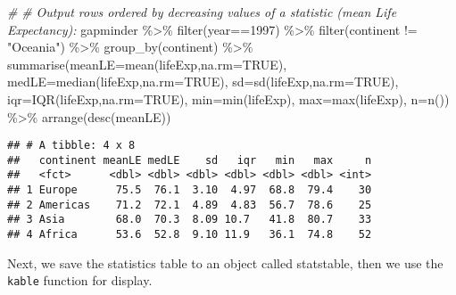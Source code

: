 \documentclass[
]{book}
\newenvironment{Shaded}{\begin{snugshade}}{\end{snugshade}}
\newcommand{\AttributeTok}[1]{\textcolor[rgb]{0.77,0.63,0.00}{#1}}
\newcommand{\CommentTok}[1]{\textcolor[rgb]{0.56,0.35,0.01}{\textit{#1}}}
\newcommand{\ConstantTok}[1]{\textcolor[rgb]{0.00,0.00,0.00}{#1}}
\newcommand{\DecValTok}[1]{\textcolor[rgb]{0.00,0.00,0.81}{#1}}
\newcommand{\FunctionTok}[1]{\textcolor[rgb]{0.00,0.00,0.00}{#1}}
\newcommand{\NormalTok}[1]{#1}
\newcommand{\SpecialCharTok}[1]{\textcolor[rgb]{0.00,0.00,0.00}{#1}}
\newcommand{\StringTok}[1]{\textcolor[rgb]{0.31,0.60,0.02}{#1}}
\begin{document}
\begin{Shaded}
\begin{Highlighting}[]
\CommentTok{\#}
\CommentTok{\# Output rows ordered by decreasing values of a statistic (mean Life Expectancy):}
\NormalTok{gapminder }\SpecialCharTok{\%\textgreater{}\%} \FunctionTok{filter}\NormalTok{(year}\SpecialCharTok{==}\DecValTok{1997}\NormalTok{) }\SpecialCharTok{\%\textgreater{}\%} 
  \FunctionTok{filter}\NormalTok{(continent }\SpecialCharTok{!=} \StringTok{"Oceania"}\NormalTok{) }\SpecialCharTok{\%\textgreater{}\%} 
  \FunctionTok{group\_by}\NormalTok{(continent) }\SpecialCharTok{\%\textgreater{}\%}
  \FunctionTok{summarise}\NormalTok{(}\AttributeTok{meanLE=}\FunctionTok{mean}\NormalTok{(lifeExp,}\AttributeTok{na.rm=}\ConstantTok{TRUE}\NormalTok{),}
            \AttributeTok{medLE=}\FunctionTok{median}\NormalTok{(lifeExp,}\AttributeTok{na.rm=}\ConstantTok{TRUE}\NormalTok{),}
            \AttributeTok{sd=}\FunctionTok{sd}\NormalTok{(lifeExp,}\AttributeTok{na.rm=}\ConstantTok{TRUE}\NormalTok{),}
            \AttributeTok{iqr=}\FunctionTok{IQR}\NormalTok{(lifeExp,}\AttributeTok{na.rm=}\ConstantTok{TRUE}\NormalTok{),}
            \AttributeTok{min=}\FunctionTok{min}\NormalTok{(lifeExp),}
            \AttributeTok{max=}\FunctionTok{max}\NormalTok{(lifeExp),}
            \AttributeTok{n=}\FunctionTok{n}\NormalTok{())  }\SpecialCharTok{\%\textgreater{}\%}
  \FunctionTok{arrange}\NormalTok{(}\FunctionTok{desc}\NormalTok{(meanLE))}
\end{Highlighting}
\end{Shaded}

\begin{verbatim}
## # A tibble: 4 x 8
##   continent meanLE medLE    sd   iqr   min   max     n
##   <fct>      <dbl> <dbl> <dbl> <dbl> <dbl> <dbl> <int>
## 1 Europe      75.5  76.1  3.10  4.97  68.8  79.4    30
## 2 Americas    71.2  72.1  4.89  4.83  56.7  78.6    25
## 3 Asia        68.0  70.3  8.09 10.7   41.8  80.7    33
## 4 Africa      53.6  52.8  9.10 11.9   36.1  74.8    52
\end{verbatim}

Next, we save the statistics table to an object called statstable, then we use the \texttt{kable} function for display.
\end{document}
